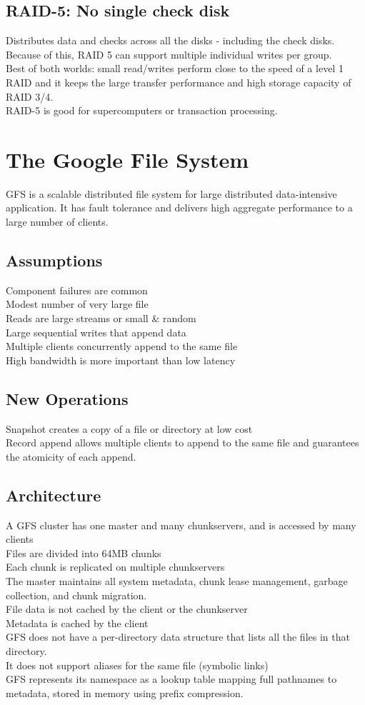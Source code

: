 \subsection{RAID-5: No single check disk}
Distributes data and checks across all the disks - including the check disks. Because of this, RAID 5 can support multiple individual writes per group.\\
Best of both worlds: small read/writes perform close to the speed of a level 1 RAID and it keeps the large transfer performance and high storage capacity of RAID 3/4.\\
RAID-5 is good for supercomputers or transaction processing.


\section{The Google File System}
GFS is a scalable distributed file system for large distributed data-intensive application. It has fault tolerance and delivers high aggregate performance to a large number of clients.
\subsection{Assumptions}
Component failures are common\\
Modest number of very large file\\
Reads are large streams or small \& random\\
Large sequential writes that append data\\
Multiple clients concurrently append to the same file \\
High bandwidth is more important than low latency\\
\subsection{New Operations}
Snapshot creates a copy of a file or directory at low cost\\
Record append allows multiple clients to append to the same file and guarantees the atomicity of each append.
\subsection{Architecture}
A GFS cluster has one master and many chunkservers, and is accessed by many clients\\
Files are divided into 64MB chunks\\
Each chunk is replicated on multiple chunkservers\\
The master maintains all system metadata, chunk lease management, garbage collection, and chunk migration. \\
File data is not cached by the client or the chunkserver\\
Metadata is cached by the client\\
GFS does not have a per-directory data structure that lists all the files in that directory.\\
It does not support aliases for the same file (symbolic links)\\
GFS represents its namespace as a lookup table mapping full pathnames to metadata, stored in memory using prefix compression.
